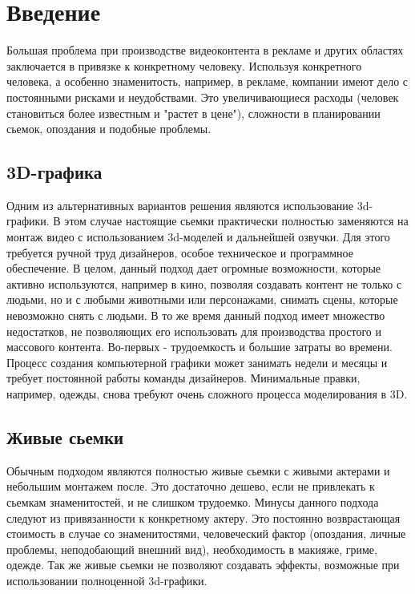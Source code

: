 \section{Введение}

Большая проблема при производстве видеоконтента в рекламе и других областях заключается в привязке к конкретному человеку. Используя конкретного человека, а особенно знаменитость, например, в рекламе, компании имеют дело с постоянными рисками и неудобствами. Это увеличивающиеся расходы (человек становиться более известным и "растет в цене"), сложности в планировании сьемок, опоздания и подобные проблемы.

\subsection*{3D-графика}

Одним из альтернативных вариантов решения являются использование 3d-графики. В этом случае настоящие сьемки практически полностью заменяются на монтаж видео с использованием 3d-моделей и дальнейшей озвучки.
Для этого требуется ручной труд дизайнеров, особое техническое и программное обеспечение.
В целом, данный подход дает огромные возможности, которые активно используются, например в кино, позволяя создавать контент не только с людьми, но и с любыми животными или персонажами, снимать сцены, которые невозможно снять с людьми.
В то же время данный подход имеет множество недостатков, не позволяющих его использовать для производства простого и массового контента. Во-первых - трудоемкость и большие затраты во времени. Процесс создания компьютерной графики может занимать недели и месяцы и требует постоянной работы команды дизайнеров. Минимальные правки, например, одежды, снова требуют очень сложного процесса моделирования в 3D.

\subsection*{Живые сьемки}

Обычным подходом являются полностью живые сьемки с живыми актерами и небольшим монтажем после. Это достаточно дешево, если не привлекать к сьемкам знаменитостей, и не слишком трудоемко. Минусы данного подхода следуют из привязанности к конкретному актеру.
Это постоянно возврастающая стоимость в случае со знаменитостями, человеческий фактор (опоздания, личные проблемы, неподобающий внешний вид), необходимость в макияже, гриме, одежде. Так же живые сьемки не позволяют создавать эффекты, возможные при использовании полноценной 3d-графики.

